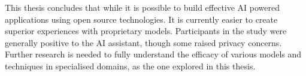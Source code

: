 \begin{scontents}[store-env=abstracts,print-env=true]
This thesis concludes that while it is possible to build effective AI powered applications using open source technologies. It is currently easier to create superior experiences with proprietary models. Participants in the study were generally positive to the AI assistant, though some raised privacy concerns. Further research is needed to fully understand the efficacy of various models and techniques in specialised domains, as the one explored in this thesis.




\end{scontents}












